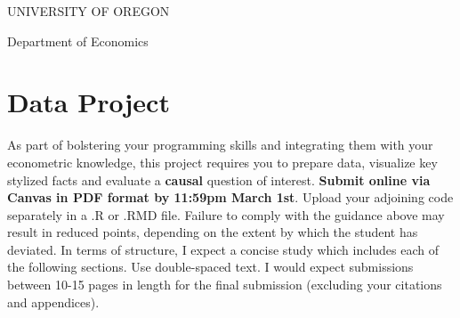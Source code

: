 \documentclass[addpoints, 12pt]{exam}
\begin{document}
	
	\singlespacing
	
	\centerline{UNIVERSITY OF OREGON}
	\centerline{Department of Economics}
	
	\bigskip
	
	\bigskip
	


\section*{Data Project}

\onehalfspacing

\bigskip

As part of bolstering your programming skills and integrating them with your econometric knowledge, this project requires you to prepare data, visualize key stylized facts and evaluate a {\bf causal} question of interest. 
{\bf Submit online via Canvas in PDF format by 11:59pm March 1st}. Upload your adjoining code separately in a .R or .RMD file. Failure to comply with the guidance above may result in reduced points, depending on the extent by which the student has deviated. 
In terms of structure, I expect a concise study which includes each of the following sections. 
Use double-spaced text. I would expect submissions between 10-15 pages in length for the final submission (excluding your citations and appendices).
\end{document}
